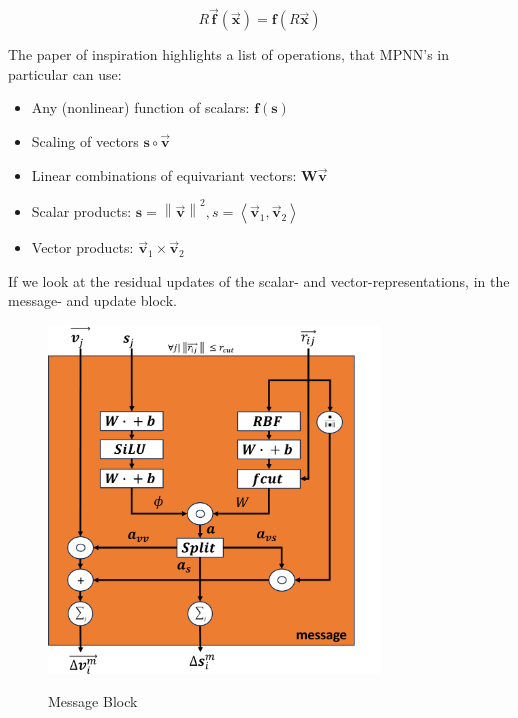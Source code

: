 \begin{equation}\label{eq:equivariant}
    R \vec{\mathbf{f}}(\vec{\mathbf{x}}) = \mathbf{\mathbf{f}}(R \vec{\mathbf{x}})
\end{equation}

The paper of inspiration \cite{PAINN} highlights a list of operations, that MPNN's in particular can use:

\begin{itemize}
    \item Any (nonlinear) function of scalars: $\mathbf{f}(\mathbf{s})$
    \item Scaling of vectors $ \mathbf{s} \circ \vec{\mathbf{v}}$
    \item Linear combinations of equivariant vectors: $\mathbf{W} \vec{\mathbf{v}}$
    \item Scalar products: $\mathbf{s} = \left \| \vec{\mathbf{v}} \right \|^{2}, s = \left \langle \vec{\mathbf{v}}_{1}, \vec{\mathbf{v}}_{2} \right \rangle$
    \item Vector products: $\vec{\mathbf{v}}_{1} \times \vec{\mathbf{v}}_{2}$
\end{itemize}

If we look at the residual updates of the scalar- and vector-representations, in the message- and update block.

\begin{figure}[H]
    \caption{Message Block}
    \centering\label{img:message_block1}
    \includegraphics[width=250pt]{Images/Method/message_block.png}
\end{figure}






